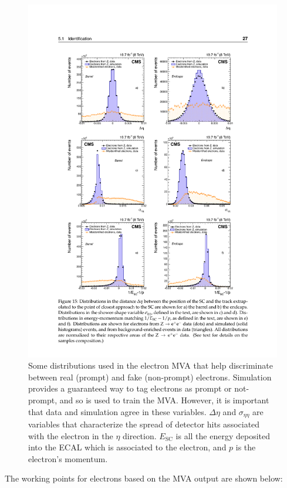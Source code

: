     \begin{figure}[!h]
      \centering
      \includegraphics[width=.8\textwidth]{figures/electron_mva_discriminating_distributions.pdf}
      \caption{Some distributions used in the electron MVA that help discriminate between real (prompt) and fake (non-prompt) electrons. Simulation provides a guaranteed way to tag electrons as prompt or not-prompt, and so is used to train the MVA. However, it is important that data and simulation agree in these variables. $\Delta \eta$ and $\sigma_{\eta\eta}$ are variables that characterize the spread of detector hits associated with the electron in the $\eta$ direction. $E_\text{SC}$ is all the energy deposited into the ECAL which is associated to the electron, and $p$ is the electron's momentum. }
      \label{fig:electron_mva_discriminating_vars}
    \end{figure}

    The working points for electrons based on the MVA output are shown below:

